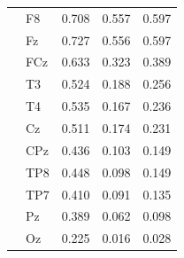 \begin{table}[htbp]
\begin{tabular}{llrrr}
 & F8 & 0.708 & 0.557 & 0.597 \\
 & Fz & 0.727 & 0.556 & 0.597 \\
 & FCz & 0.633 & 0.323 & 0.389 \\
 & T3 & 0.524 & 0.188 & 0.256 \\
 & T4 & 0.535 & 0.167 & 0.236 \\
 & Cz & 0.511 & 0.174 & 0.231 \\
 & CPz & 0.436 & 0.103 & 0.149 \\
 & TP8 & 0.448 & 0.098 & 0.149 \\
 & TP7 & 0.410 & 0.091 & 0.135 \\
 & Pz & 0.389 & 0.062 & 0.098 \\
 & Oz & 0.225 & 0.016 & 0.028 \\
\bottomrule
\end{tabular}
\end{table}
